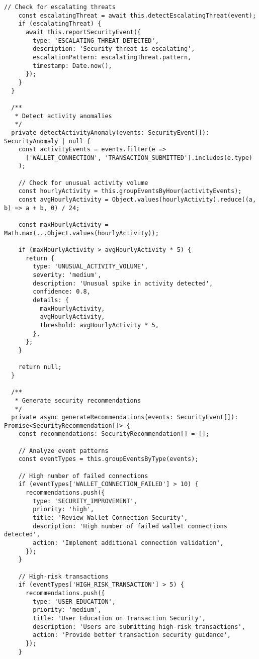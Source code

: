 \documentclass[11pt,a4paper]{article}
\begin{document}
\begin{lstlisting}[style=typescript, caption=Security Monitoring System]
    // Check for escalating threats
    const escalatingThreat = await this.detectEscalatingThreat(event);
    if (escalatingThreat) {
      await this.reportSecurityEvent({
        type: 'ESCALATING_THREAT_DETECTED',
        description: 'Security threat is escalating',
        escalationPattern: escalatingThreat.pattern,
        timestamp: Date.now(),
      });
    }
  }

  /**
   * Detect activity anomalies
   */
  private detectActivityAnomaly(events: SecurityEvent[]): SecurityAnomaly | null {
    const activityEvents = events.filter(e => 
      ['WALLET_CONNECTION', 'TRANSACTION_SUBMITTED'].includes(e.type)
    );

    // Check for unusual activity volume
    const hourlyActivity = this.groupEventsByHour(activityEvents);
    const avgHourlyActivity = Object.values(hourlyActivity).reduce((a, b) => a + b, 0) / 24;
    
    const maxHourlyActivity = Math.max(...Object.values(hourlyActivity));
    
    if (maxHourlyActivity > avgHourlyActivity * 5) {
      return {
        type: 'UNUSUAL_ACTIVITY_VOLUME',
        severity: 'medium',
        description: 'Unusual spike in activity detected',
        confidence: 0.8,
        details: {
          maxHourlyActivity,
          avgHourlyActivity,
          threshold: avgHourlyActivity * 5,
        },
      };
    }

    return null;
  }

  /**
   * Generate security recommendations
   */
  private async generateRecommendations(events: SecurityEvent[]): Promise<SecurityRecommendation[]> {
    const recommendations: SecurityRecommendation[] = [];

    // Analyze event patterns
    const eventTypes = this.groupEventsByType(events);

    // High number of failed connections
    if (eventTypes['WALLET_CONNECTION_FAILED'] > 10) {
      recommendations.push({
        type: 'SECURITY_IMPROVEMENT',
        priority: 'high',
        title: 'Review Wallet Connection Security',
        description: 'High number of failed wallet connections detected',
        action: 'Implement additional connection validation',
      });
    }

    // High-risk transactions
    if (eventTypes['HIGH_RISK_TRANSACTION'] > 5) {
      recommendations.push({
        type: 'USER_EDUCATION',
        priority: 'medium',
        title: 'User Education on Transaction Security',
        description: 'Users are submitting high-risk transactions',
        action: 'Provide better transaction security guidance',
      });
    }


\end{lstlisting}
\end{document}
